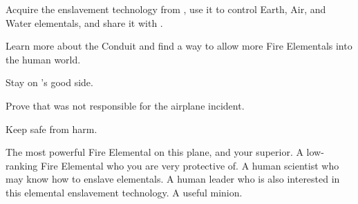 \documentclass[char]{elementals}
\begin{document}
\begin{itemz}[Goals]
  \item Acquire the enslavement technology from \cMS{}, use it to control Earth, Air, and Water elementals, and share it with \cQueen{}.
  \item Learn more about the Conduit and find a way to allow more Fire Elementals into the human world.
  \item Stay on \cQueen{}'s good side.
  \item Prove that \cJuliet{} was not responsible for the airplane incident.
  \item Keep \cJuliet{} safe from harm.
\end{itemz}

\begin{contacts}
  \contact{\cQueen{}}  The most powerful Fire Elemental on this plane, and your superior.
  \contact{\cJuliet{}}  A low-ranking Fire Elemental who you are very protective of.
  \contact{\cMS{}}  A human scientist who may know how to enslave elementals.
  \contact{\cDema{}} A human leader who is also interested in this elemental enslavement technology.  A useful minion.
\end{contacts}
\end{document}
